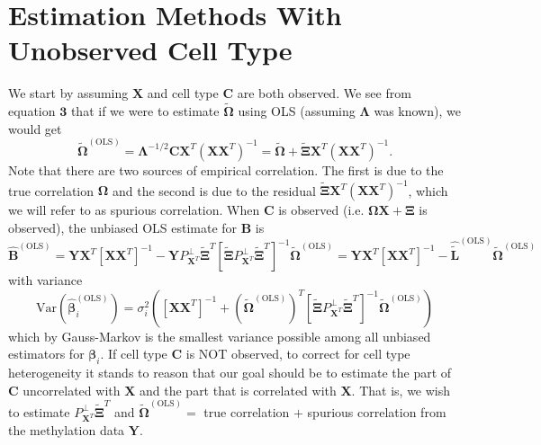 \documentclass{article}
\begin{document}
\section{Estimation Methods With Unobserved Cell Type}
We start by assuming $\bm{X}$ and cell type $\bm{C}$ are both observed. We see from equation $\bm{3}$ that if we were to estimate $\tilde{\bm{\Omega}}$ using OLS (assuming $\bm{\Lambda}$ was known), we would get
\begin{equation}
\tilde{\bm{\Omega}}^{(\text{OLS})} = \bm{\Lambda}^{-1/2}\bm{C}\bm{X}^T \left( \bm{X}\bm{X}^T \right)^{-1} = \tilde{\bm{\Omega}} + \tilde{\bm{\Xi}}\bm{X}^T \left( \bm{X}\bm{X}^T \right)^{-1}.
\end{equation} 
Note that there are two sources of empirical correlation. The first is due to the true correlation $\bm{\Omega}$ and the second is due to the residual $\tilde{\bm{\Xi}}\bm{X}^T \left( \bm{X}\bm{X}^T \right)^{-1}$, which we will refer to as spurious correlation. When $\bm{C}$ is observed (i.e. $\bm{\Omega} \bm{X} + \bm{\Xi}$ is observed), the unbiased OLS estimate for $\bm{B}$ is
\begin{equation}
\hat{\bm{B}}^{(\text{OLS})} = \bm{Y} \bm{X}^T \left[ \bm{X}\bm{X}^T \right]^{-1} - \bm{Y} P_{\bm{X}^T}^{\perp} \tilde{\bm{\Xi}}^T \left[ \tilde{\bm{\Xi}} P_{\bm{X}^T}^{\perp}\tilde{\bm{\Xi}}^T \right]^{-1} \tilde{\bm{\Omega}}^{(\text{OLS})} = \bm{Y} \bm{X}^T \left[ \bm{X}\bm{X}^T \right]^{-1} - \hat{\tilde{\bm{L}}}^{(\text{OLS})} \tilde{\bm{\Omega}}^{(\text{OLS})}
\end{equation}
with variance
\begin{equation}
\text{Var}\left( \hat{\bm{\beta}}_i^{(\text{OLS})} \right) = \sigma_i^2\left( \left[ \bm{X}\bm{X}^T \right]^{-1} + \left( \tilde{\bm{\Omega}}^{(\text{OLS})}\right)^T \left[ \tilde{\bm{\Xi}} P_{\bm{X}^T}^{\perp}\tilde{\bm{\Xi}}^T \right]^{-1}\tilde{\bm{\Omega}}^{(\text{OLS})} \right)
\end{equation} 
which by Gauss-Markov is the smallest variance possible among all unbiased estimators for $\bm{\beta}_i$. If cell type $\bm{C}$ is NOT observed, to correct for cell type heterogeneity it stands to reason that our goal should be to estimate the part of $\bm{C}$ uncorrelated with $\bm{X}$ and the part that is correlated with $\bm{X}$. That is, we wish to estimate $P_{\bm{X}^T}^{\perp}\tilde{\bm{\Xi}}^T$ and $\tilde{\bm{\Omega}}^{(\text{OLS})} = $ true correlation $+$ spurious correlation from the methylation data $\bm{Y}$.\\
\end{document}
